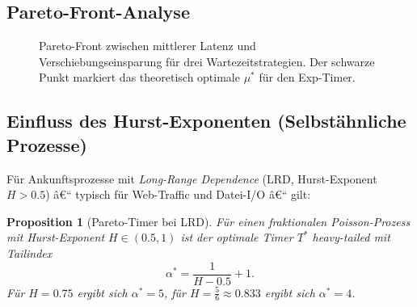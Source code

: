 ﻿\documentclass[12pt, a4paper]{article}
\newtheorem{proposition}[theorem]{Proposition}
\DeclareMathOperator{\E}{\mathbb{E}}
\begin{document}
\subsection{Pareto-Front-Analyse}

\begin{figure}[ht]
\centering
{}
\caption{Pareto-Front zwischen mittlerer Latenz und Verschiebungseinsparung
         für drei Wartezeitstrategien. Der schwarze Punkt markiert das
         theoretisch optimale $\mu^*$ für den Exp-Timer.}
\label{fig:paretofront}
\end{figure}

\subsection{Einfluss des Hurst-Exponenten (Selbstähnliche Prozesse)}

Für Ankunftsprozesse mit \emph{Long-Range Dependence} (LRD, Hurst-Exponent
$H > 0.5$) â€“ typisch für Web-Traffic und Datei-I/O â€“ gilt:

\begin{proposition}[Pareto-Timer bei LRD]\label{prop:lrd}
Für einen fraktionalen Poisson-Prozess mit Hurst-Exponent $H \in (0.5, 1)$
ist der optimale Timer $T^*$ heavy-tailed mit Tailindex
\[
  \alpha^* = \frac{1}{H - 0.5} + 1.
\]
Für $H = 0.75$ ergibt sich $\alpha^* = 5$, für $H = \frac{5}{6} \approx 0.833$
ergibt sich $\alpha^* = 4$.
\end{proposition}
\end{document}
